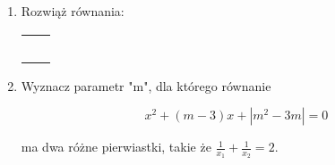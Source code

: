 \documentclass[12pt,a4paper]{article}
\begin{document}
	\begin{enumerate}[1.]
		
		\item Rozwiąż równania: %
		
		\begin{enumerate}[a)] \begin{tabular}{p{7cm} p{7cm}} 
				\item $||x+3|-4|=5$ & \vspace{0.4cm} 	\item$||x-1|-1|=|x-2|$ \\
				\item $\sqrt{x^2+4x+3}<\frac{25}{3}-\sqrt{x^2-6x+9}$ & \item $2x^2+x|2x-1|\leq3$ \\
				\item $(x-1)^2+|x-1|>6$ & \item $|x^2-3x|+x=2$ \\
				\item $x|x|+|2x-3|=4$ & \item $|x^2-|x|-2|>2$ \\
				\item $|x^2-x-2|=|x^2-2x-3|$ & \\
		\end{tabular} \end{enumerate}
		
		\item Wyznacz parametr "m", dla którego równanie 
		
		$$x^2+(m-3)x+|m^2-3m|=0$$
		
		ma dwa różne pierwiastki, takie że $\frac{1}{x_1}+\frac{1}{x_2}=2$.
		
	\end{enumerate}
	
	
	
\end{document}
